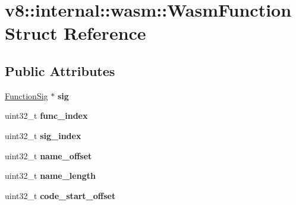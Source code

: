 \hypertarget{structv8_1_1internal_1_1wasm_1_1_wasm_function}{}\section{v8\+:\+:internal\+:\+:wasm\+:\+:Wasm\+Function Struct Reference}
\label{structv8_1_1internal_1_1wasm_1_1_wasm_function}
\subsection*{Public Attributes}
\begin{DoxyCompactItemize}
\item 
\hyperlink{classv8_1_1internal_1_1_signature}{Function\+Sig} $\ast$ {\bfseries sig}\hypertarget{structv8_1_1internal_1_1wasm_1_1_wasm_function_ad391006f992ed49217dcc0437650006f}{}\label{structv8_1_1internal_1_1wasm_1_1_wasm_function_ad391006f992ed49217dcc0437650006f}

\item 
uint32\+\_\+t {\bfseries func\+\_\+index}\hypertarget{structv8_1_1internal_1_1wasm_1_1_wasm_function_a8b451aaa09042c8dcc935d85f4fa0422}{}\label{structv8_1_1internal_1_1wasm_1_1_wasm_function_a8b451aaa09042c8dcc935d85f4fa0422}

\item 
uint32\+\_\+t {\bfseries sig\+\_\+index}\hypertarget{structv8_1_1internal_1_1wasm_1_1_wasm_function_a9ac4b76d03024a8579bec15a76059c99}{}\label{structv8_1_1internal_1_1wasm_1_1_wasm_function_a9ac4b76d03024a8579bec15a76059c99}

\item 
uint32\+\_\+t {\bfseries name\+\_\+offset}\hypertarget{structv8_1_1internal_1_1wasm_1_1_wasm_function_a22c62625a3f91c0cc7d2f30b943612d2}{}\label{structv8_1_1internal_1_1wasm_1_1_wasm_function_a22c62625a3f91c0cc7d2f30b943612d2}

\item 
uint32\+\_\+t {\bfseries name\+\_\+length}\hypertarget{structv8_1_1internal_1_1wasm_1_1_wasm_function_a29cea8c922cf18e64d5432ed647007c2}{}\label{structv8_1_1internal_1_1wasm_1_1_wasm_function_a29cea8c922cf18e64d5432ed647007c2}

\item 
uint32\+\_\+t {\bfseries code\+\_\+start\+\_\+offset}\hypertarget{structv8_1_1internal_1_1wasm_1_1_wasm_function_a372fcf72ed6014f7d10dfc486d8354fb}{}\label{structv8_1_1internal_1_1wasm_1_1_wasm_function_a372fcf72ed6014f7d10dfc486d8354fb}


\end{DoxyCompactItemize}
